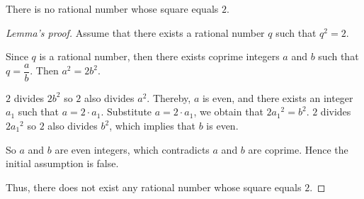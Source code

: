 \begin{lemma}
    There is no rational number whose square equals $2$.
\end{lemma}
\begin{proof}[Lemma's proof]
    Assume that there exists a rational number $q$ such that ${q}^{2} = 2$.

    Since $q$ is a rational number, then there exists coprime integers $a$ and $b$ such that $q = \dfrac{a}{b}$. Then ${a}^{2} = 2{b}^{2}$.

    $2$ divides $2{b}^{2}$ so $2$ also divides ${a}^{2}$. Thereby, $a$ is even, and there exists an integer $a_{1}$ such that $a = 2\cdot a_{1}$. Substitute $a = 2\cdot a_{1}$, we obtain that $2{a_{1}}^{2} = b^{2}$. $2$ divides $2{a_{1}}^{2}$ so $2$ also divides ${b}^{2}$, which implies that $b$ is even.

    So $a$ and $b$ are even integers, which contradicts $a$ and $b$ are coprime. Hence the initial assumption is false.

    Thus, there does not exist any rational number whose square equals $2$.
\end{proof}

